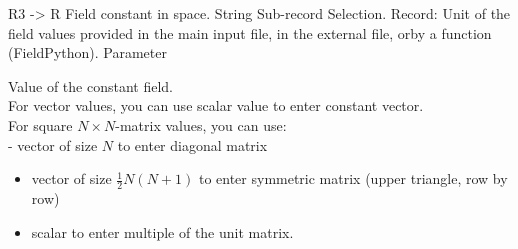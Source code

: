 \begin{RecordType}
	{}
	{} %
	{} %
	{} %
	{{{R3 -{\textgreater} R Field constant in space.}}}
		\KeyItem
			{}
			{{String}}
			{\textrangle}
			{} %
			{{{Sub-record Selection.}}}
		\KeyItem
			{}
			{{Record}{: }}
			{\textrangle}
			{} %
			{{{Unit of the field values provided in the main input file, in the external file, orby a function (FieldPython).}}}
		\KeyItem
			{}
			{{Parameter}}
			{\textrangle}
			{} %
			{{{{Value of the constant field.}\\{
For vector values, you can use scalar value to enter constant vector.}\\{
For square }{$N\times N$}{-matrix values, you can use:}\\{
 - vector of size }{$N$}{ to enter diagonal matrix}
}
\begin{itemize}
\item {vector of size }{$\frac12N(N+1)$}{ to enter symmetric matrix (upper triangle, row by row)}
\item {scalar to enter multiple of the unit matrix.}
\end{itemize}
}}
\end{RecordType}

